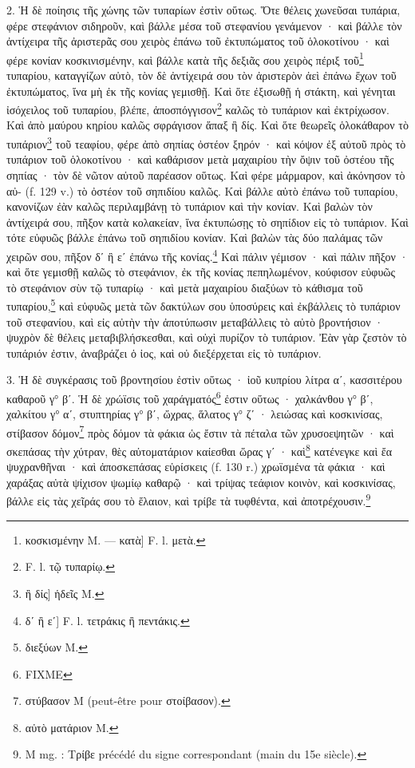 \documentclass[a4paper, 11pt, oneside, polutonikogreek, french]{article}
\begin{document}
2. Ἡ δὲ ποίησις τῆς χώνης τῶν τυπαρίων ἐστὶν οὕτως. Ὅτε θέλεις χωνεῦσαι τυπάρια, φέρε στεφάνιον σιδηροῦν, καὶ βάλλε μέσα τοῦ στεφανίου γενάμενον · καὶ βάλλε τὸν ἀντίχειρα τῆς ἀριστερᾶς σου χειρὸς ἐπάνω τοῦ ἐκτυπώματος τοῦ ὁλοκοτίνου · καὶ φέρε κονίαν κοσκινισμένην, καὶ βάλλε κατὰ τῆς δεξιᾶς σου χειρὸς πέριξ τοῦ\footnote{κοσκισμένην M. --- κατὰ] F. l. μετὰ.} τυπαρίου, καταγγίζων αὐτὸ, τὸν δὲ ἀντίχειρά σου τὸν ἀριστερὸν ἀεὶ ἐπάνω ἔχων τοῦ ἐκτυπώματος, ἵνα μὴ ἐκ τῆς κονίας γεμισθῇ. Καὶ ὅτε ἐξισωθῇ ἡ στάκτη, καὶ γένηται ἰσόχειλος τοῦ τυπαρίου, βλέπε, ἀποσπόγγισον\footnote{F. l. τῷ τυπαρίῳ.} καλῶς τὸ τυπάριον καὶ ἐκτρίχωσον. Καὶ ἀπὸ μαύρου κηρίου καλῶς σφράγισον ἅπαξ ἢ δίς. Καὶ ὅτε θεωρεῖς ὁλοκάθαρον τὸ τυπάριον\footnote{ἢ δίς] ἡδεῖς M.} τοῦ τεαφίου, φέρε ἀπὸ σηπίας ὀστέον ξηρόν · καὶ κόψον ἐξ αὐτοῦ πρὸς τὸ τυπάριον τοῦ ὁλοκοτίνου · καὶ καθάρισον μετὰ μαχαιρίου τὴν ὄψιν τοῦ ὀστέου τῆς σηπίας · τὸν δὲ νῶτον αὐτοῦ παρέασον οὕτως. Καὶ φέρε μάρμαρον, καὶ ἀκόνησον τὸ αὐ- (f. 129 v.) τὸ ὀστέον τοῦ σηπιδίου καλῶς. Καὶ βάλλε αὐτὸ ἐπάνω τοῦ τυπαρίου, κανονίζων ἐὰν καλῶς περιλαμβάνῃ τὸ τυπάριον καὶ τὴν κονίαν. Καὶ βαλὼν τὸν ἀντίχειρά σου, πῆξον κατὰ κολακείαν, ἵνα ἐκτυπώσῃς τὸ σηπίδιον εἰς τὸ τυπάριον. Καὶ τότε εὐφυῶς βάλλε ἐπάνω τοῦ σηπιδίου κονίαν. Καὶ βαλὼν τὰς δύο παλάμας τῶν χειρῶν σου, πῆξον δʹ ἢ εʹ ἐπάνω τῆς κονίας.\footnote{δʹ ἢ εʹ] F. l. τετράκις ἢ πεντάκις.} Καὶ πάλιν γέμισον · καὶ πάλιν πῆξον · καὶ ὅτε γεμισθῇ καλῶς τὸ στεφάνιον, ἐκ τῆς κονίας πεπηλωμένον, κούφισον εὐφυῶς τὸ στεφάνιον σὺν τῷ τυπαρίῳ · καὶ μετὰ μαχαιρίου διαξύων τὸ κάθισμα τοῦ τυπαρίου,\footnote{διεξύων M.} καὶ εὐφυῶς μετὰ τῶν δακτύλων σου ὑποσύρεις καὶ ἐκβάλλεις τὸ τυπάριον τοῦ στεφανίου, καὶ εἰς αὐτὴν τὴν ἀποτύπωσιν μεταβάλλεις τὸ αὐτὸ βροντήσιον · ψυχρὸν δὲ θέλεις μεταβιβλήσκεσθαι, καὶ οὐχὶ πυρίζον τὸ τυπάριον. Ἐὰν γὰρ ζεστὸν τὸ τυπάριόν ἐστιν, ἀναβράζει ὁ ἰος, καὶ οὐ διεξέρχεται εἰς τὸ τυπάριον.

3. Ἡ δὲ συγκέρασις τοῦ βροντησίου ἐστὶν οὕτως · ἰοῦ κυπρίου λίτρα αʹ, κασσιτέρου καθαροῦ γ° βʹ. Ἡ δὲ χρώϊσις τοῦ χαράγματός\footnote{FIXME} ἐστιν οὕτως · χαλκάνθου γ° βʹ, χαλκίτου γ° αʹ, στυπτηρίας γ° βʹ, ὤχρας, ἅλατος γ° ζʹ · λειώσας καὶ κοσκινίσας, στίβασον δόμον\footnote{στύβασον M (peut-être pour στοίβασον).} πρὸς δόμον τὰ φάκια ὡς ἔστιν τὰ πέταλα τῶν χρυσοεψητῶν · καὶ σκεπάσας τὴν χύτραν, θὲς αὐτοματάριον καίεσθαι ὥρας γʹ · καὶ\footnote{αὐτὸ ματάριον M.} κατένεγκε καὶ ἔα ψυχρανθῆναι · καὶ ἀποσκεπάσας εὑρίσκεις (f. 130 r.) χρωϊσμένα τὰ φάκια · καὶ χαράξας αὐτὰ ψίχισον ψωμίῳ καθαρῷ · καὶ τρίψας τεάφιον κοινὸν, καὶ κοσκινίσας, βάλλε εἰς τὰς χεῖράς σου τὸ ἔλαιον, καὶ τρίβε τὰ τυφθέντα, καὶ ἀποτρέχουσιν.\footnote{M mg. : Τρίβε précédé du signe correspondant (main du 15e siècle).}
\end{document}
